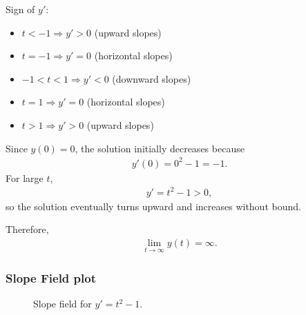 \documentclass[letterpaper,10pt,english]{sphinxmanual}
\begin{document}
\sphinxAtStartPar
Sign of \(y'\):
\begin{itemize}
\item {} 
\sphinxAtStartPar
\(t < -1 \Rightarrow y' > 0\) (upward slopes)

\item {} 
\sphinxAtStartPar
\(t = -1 \Rightarrow y' = 0\) (horizontal slopes)

\item {} 
\sphinxAtStartPar
\(-1 < t < 1 \Rightarrow y' < 0\) (downward slopes)

\item {} 
\sphinxAtStartPar
\(t = 1 \Rightarrow y' = 0\) (horizontal slopes)

\item {} 
\sphinxAtStartPar
\(t > 1 \Rightarrow y' > 0\) (upward slopes)

\end{itemize}

\sphinxAtStartPar
Since \(y(0)=0\), the solution initially decreases because
\begin{equation*}
\begin{split}y'(0)=0^2-1=-1.\end{split}
\end{equation*}
\sphinxAtStartPar
For large \(t\),
\begin{equation*}
\begin{split}y' = t^2 - 1 > 0,\end{split}
\end{equation*}
\sphinxAtStartPar
so the solution eventually turns upward and increases without bound.

\sphinxAtStartPar
Therefore,
\begin{equation*}
\begin{split}\lim_{t\to\infty} y(t)=\infty.\end{split}
\end{equation*}

\subsubsection{Slope Field plot}
\label{\detokenize{Language/Science_language/ODE_calculus/course_MATH_3035/homework_assignments/index_pdf:id1}}
\begin{figure}[htbp]
\centering
\capstart

\noindent{}
\caption{Slope field for \(y' = t^2 - 1\).}\label{\detokenize{Language/Science_language/ODE_calculus/course_MATH_3035/homework_assignments/index_pdf:id9}}\end{figure}
\end{document}
